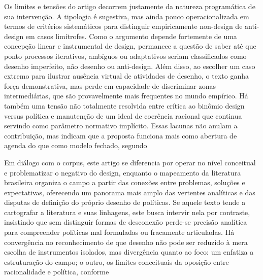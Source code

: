 \documentclass[12pt,a4paper]{article}
\begin{document}
Os limites e tensões do artigo decorrem justamente da natureza programática de sua intervenção. A tipologia é sugestiva, mas ainda pouco operacionalizada em termos de critérios sistemáticos para distinguir empiricamente non-design de anti-design em casos limítrofes. Como o argumento depende fortemente de uma concepção linear e instrumental de design, permanece a questão de saber até que ponto processos iterativos, ambíguos ou adaptativos seriam classificados como desenho imperfeito, não desenho ou anti-design. Além disso, ao escolher um caso extremo para ilustrar ausência virtual de atividades de desenho, o texto ganha força demonstrativa, mas perde em capacidade de discriminar zonas intermediárias, que são provavelmente mais frequentes no mundo empírico. Há também uma tensão não totalmente resolvida entre crítica ao binômio design versus política e manutenção de um ideal de coerência racional que continua servindo como parâmetro normativo implícito. Essas lacunas não anulam a contribuição, mas indicam que a proposta funciona mais como abertura de agenda do que como modelo fechado, segundo\parencite{newman2020_policy_design}

Em diálogo com o corpus, este artigo se diferencia por operar no nível conceitual e problematizar o negativo do design, enquanto o mapeamento da literatura brasileira organiza o campo a partir das conexões entre problemas, soluções e expectativas, oferecendo um panorama mais amplo das vertentes analíticas e das disputas de definição do próprio desenho de políticas. Se aquele texto tende a cartografar a literatura e suas linhagens, este busca intervir nela por contraste, insistindo que sem distinguir formas de desconexão perde-se precisão analítica para compreender políticas mal formuladas ou fracamente articuladas. Há convergência no reconhecimento de que desenho não pode ser reduzido à mera escolha de instrumentos isolados, mas divergência quanto ao foco: um enfatiza a estruturação do campo; o outro, os limites conceituais da oposição entre racionalidade e política, conforme\parencite{lima2021_conectando_problemas,newman2020_policy_design}
\end{document}
